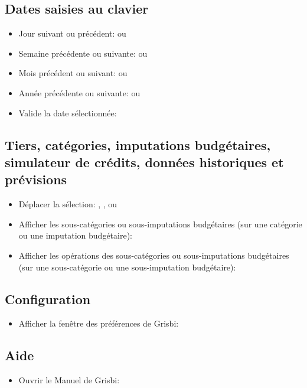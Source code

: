 \subsection{Dates saisies au clavier}

\begin{itemize}
	\item Jour suivant ou précédent: \keys{{+}} ou \keys{{-}}
	\item Semaine précédente ou suivante:  ou 
	\item Mois précédent ou suivant:  ou 
	\item Année précédente ou suivante:  ou 
	\item Valide la date sélectionnée: 
\end{itemize}


\subsection{Tiers, catégories, imputations budgétaires, simulateur de crédits, données historiques et prévisions}

\begin{itemize}
	\item Déplacer la sélection: \keys{\arrowkeyup}, \keys{\arrowkeydown},  ou 
	\item Afficher les sous-catégories ou sous-imputations budgétaires (sur une catégorie ou une imputation budgétaire): \keys{{+}}
	\item Afficher les opérations des sous-catégories ou sous-imputations budgétaires (sur une sous-catégorie ou une sous-imputation budgétaire): 
\end{itemize}


\subsection{Configuration}

\begin{itemize}
	\item Afficher la fenêtre des préférences de Grisbi: 
\end{itemize}

\subsection{Aide}

\begin{itemize}
	\item Ouvrir le Manuel de Grisbi: 
\end{itemize}
